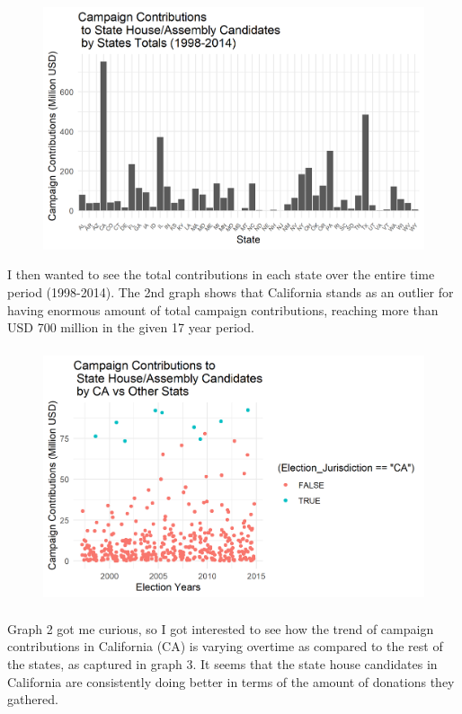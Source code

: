 \documentclass{article}
\begin{document}
\begin{figure}[htp]
    \centering
    \includegraphics[]{PS6b_Chaudhry.png}
\end{figure} 
I then wanted to see the total contributions in each state over the entire time period (1998-2014). The 2nd graph shows that California stands as an outlier for having enormous amount of total campaign contributions, reaching more than USD 700 million in the given 17 year period.

\begin{figure}[htp]
    \centering
    \includegraphics[height=7.5cm]{PS6c_Chaudhry.png}
\end{figure}

Graph 2 got me curious, so I got interested to see how the trend of campaign contributions in California (CA) is varying overtime as compared to the rest of the states, as captured in graph 3. It seems that the state house candidates in California are consistently doing better in terms of the amount of donations they gathered.
\end{document}
